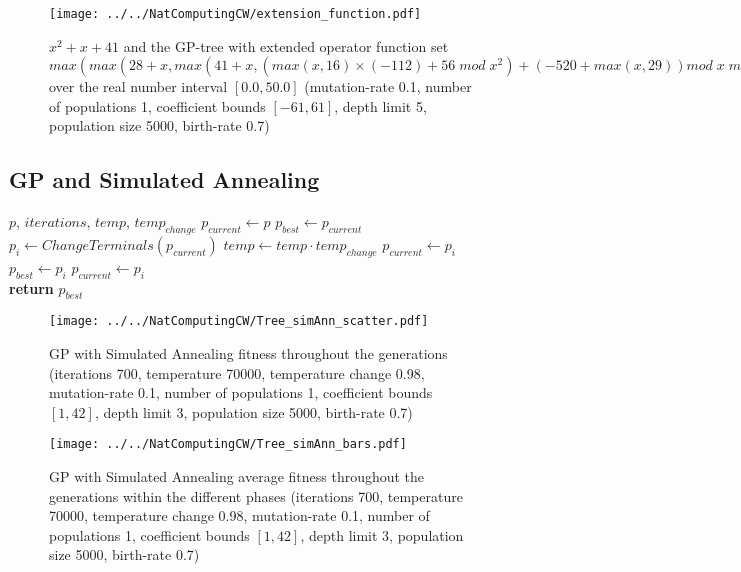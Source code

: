 \documentclass[11pt,a4paper]{article}
\begin{document}
\begin{appendices}
\begin{figure}[h]
\centering
\texttt{[image: ../../NatComputingCW/extension\_function.pdf]} 
\caption{$x^2 + x +41$ and the GP-tree with extended operator function set $max(max(28 + x, max(41 + x, (max(x, 16)×(-112) + 56 \;mod\; x^2) + (-520 + max(x, 29)) mod \; x \; mod \;2\; mod \;(51 x))) + x^2, max(15 x, x \;mod \;53 \;mod\; max(11, x)) + (x - 46))$ over the real number interval $[0.0, 50.0]$ (mutation-rate 0.1, number of populations 1, coefficient bounds $[-61, 61]$, depth limit 5, population size 5000, birth-rate 0.7)}
\label{fig:extension_function_2}
\end{figure}

\subsection*{GP and Simulated Annealing}

\begin{algorithm}[h]
\begin{algorithmic}
    $p$, $iterations$, $temp$, $temp_{change}$
   \STATE $p_{current} \leftarrow p$
   \STATE $p_{best} \leftarrow p_{current}$
   \STATE $p_i \leftarrow ChangeTerminals(p_{current})$
   \STATE $temp \leftarrow temp \cdot temp_{change}$
       \STATE $p_{current} \leftarrow p_i$
           \STATE $p_{best} \leftarrow p_i$
       \ENDIF
   	   \STATE $p_{current} \leftarrow p_i$
   \ENDIF
   \ENDFOR \\
   \textbf{return} $p_{best}$
\end{algorithmic}
  \caption{Simulated Annealing}
  \label{alg:SimAnn}
\end{algorithm}

\begin{figure}[h]
\centering
\texttt{[image: ../../NatComputingCW/Tree\_simAnn\_scatter.pdf]} 
\caption{GP with Simulated Annealing fitness throughout the generations (iterations 700, temperature 70000, temperature change 0.98, mutation-rate 0.1, number of populations 1, coefficient bounds $[1, 42]$, depth limit 3, population size 5000, birth-rate 0.7)}
\label{fig:simAnn_1}
\end{figure}

\begin{figure}[h]
\centering
\texttt{[image: ../../NatComputingCW/Tree\_simAnn\_bars.pdf]} 
\caption{GP with Simulated Annealing average fitness throughout the generations within the different phases (iterations 700, temperature 70000, temperature change 0.98, mutation-rate 0.1, number of populations 1, coefficient bounds $[1, 42]$, depth limit 3, population size 5000, birth-rate 0.7)}
\label{fig:simAnn_2}
\end{figure}

\end{appendices}
\end{document}
